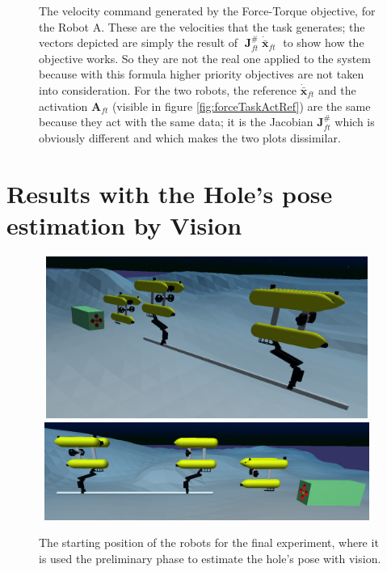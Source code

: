 \begin{figure}[H]
	\caption[Plots of the velocity command generated by the Force-Torque objective]{The velocity command generated by the Force-Torque objective, for the Robot A. These are the velocities that the task generates; the vectors depicted are simply the result of $\; \boldsymbol{J}^{\#}_{ft} \; \dot{\bar{\boldsymbol{x}}}_{ft}\;$ to show how the objective works. So they are not the real one applied to the system because with this formula higher priority objectives are not taken into consideration. For the two robots, the reference $\dot{\bar{\boldsymbol{x}}}_{ft}$ and the activation $\boldsymbol{A}_{ft}$ (visible in figure \ref{fig:forceTaskActRef}) are the same because they act with the same data; it is the Jacobian $\boldsymbol{J}^{\#}_{ft}$ which is obviously different and which makes the two plots dissimilar.}
	\label{fig:forceTaskVelocities}
\end{figure}


\section{Results with the Hole's pose estimation by Vision}
\label{sec:finalTest}
\begin{figure}[H]
	\centering
	\includegraphics[width=11cm, height=5.3cm]{uwsim_scenario_all0.png}
	\includegraphics[width=11cm, height=3.2cm]{uwsim_scenario_all1.png}
	
	\caption[Scenario for the final test with Vision]{The starting position of the robots for the final experiment, where it is used the preliminary phase to estimate the hole's pose with vision.}
	\label{fig:uwsim_expAll}
\end{figure}

